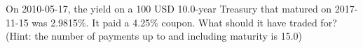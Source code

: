 On 2010-05-17, the yield on a 100 USD 10.0-year Treasury that matured on 2017-11-15 was 2.9815\%. It paid a 4.25\% coupon. What should it have traded for? (Hint: the number of payments up to and including maturity is 15.0)
